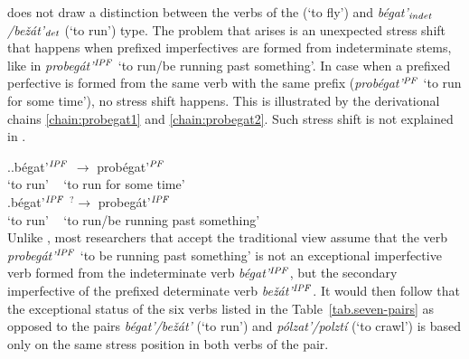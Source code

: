 \citet{Janda:10} does not draw a distinction between the verbs of the  (`to fly') and \textit{b\'{e}gat'$_{\mathit{indet}}$/be\v{z}\'{a}t'$_{\mathit{det}}$} (`to run') type. The problem that arises is an unexpected stress shift that happens when prefixed imperfectives are formed from indeterminate stems, like in \textit{probeg\'{a}t'}$^{{\mathit{IPF}}}$ `to run/be running past something'. In case when a prefixed perfective is formed from the same verb with the same prefix (\textit{prob\'{e}g{a}t'}$^{{\mathit{PF}}}$ `to run for some time'), no stress shift happens. This is illustrated by the derivational chains \ref{chain:probegat1} and \ref{chain:probegat2}. Such stress shift is not explained in \citet{Janda:10}.

\ex.\ag.\label{chain:probegat1}b\'{e}gat'$^{\mathit{IPF}}$ $\rightarrow$ prob\'{e}gat'$^{\mathit{PF}}$\\
{`to run'} {~} {`to run for some time'}\\
\bg.\label{chain:probegat2}b\'{e}gat'$^{\mathit{IPF}}$ $^?\rightarrow$ probeg\'{a}t'$^{\mathit{IPF}}$\\
{`to run'} {~} {`to run/be running past something'}\\

Unlike \citet{Janda:10}, most researchers that accept the traditional view assume that the verb \textit{probeg\'{a}t'}$^{{\mathit{IPF}}}$ `to be running past something' is not an exceptional imperfective verb formed from the indeterminate verb  \textit{b\'{e}gat'}$^{{\mathit{IPF}}}$, but the secondary imperfective of the prefixed determinate verb \textit{be\v{z}\'{a}t'}$^{{\mathit{IPF}}}$. It would then follow that the exceptional status of the six verbs listed in the Table~\ref{tab.seven-pairs} as opposed to the pairs \textit{b\'{e}gat'/be\v{z}\'{a}t'} (`to run') and \textit{p\'{o}lzat'/polzt\'{i}} (`to crawl') is based only on the same stress position in both verbs of the pair. 

